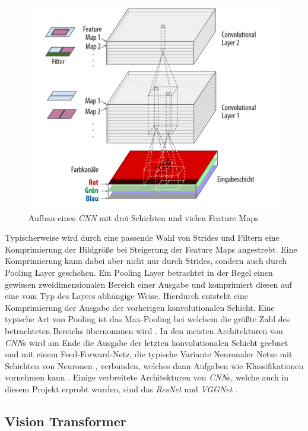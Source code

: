 \documentclass[twoside,a4paper]{IEEEtran}
\begin{document}
\begin{figure}[!htb]
	\includegraphics[width=\columnwidth]{cnn_example}
	\caption{Aufbau eines \emph{CNN} mit drei Schichten und vielen Feature Maps \cite[S.365]{MACHINE_LEARNING}}
	\label{bild2}
\end{figure}

Typischerweise wird durch eine passende Wahl von Strides und Filtern eine Komprimierung der Bildgröße bei Steigerung der Feature Maps angestrebt. Eine Komprimierung kann dabei aber nicht nur durch Strides, sondern auch durch Pooling Layer geschehen. Ein Pooling Layer betrachtet in der Regel einen gewissen zweidimensionalen Bereich einer Ausgabe und komprimiert diesen auf eine vom Typ des Layers abhängige Weise. Hierdurch entsteht eine Komprimierung der Ausgabe der vorherigen konvolutionalen Schicht. Eine typische Art von Pooling ist das Max-Pooling bei welchem die größte Zahl des betrachteten Bereichs übernommen wird \cite[S.369-370]{MACHINE_LEARNING}. In den meisten Architekturen von \emph{CNN}s wird am Ende die Ausgabe der letzten konvolutionalen Schicht geebnet und mit einem Feed-Forward-Netz, die typische Variante Neuronaler Netze mit Schichten von Neuronen \cite[S.263]{MACHINE_LEARNING}, verbunden, welches dann Aufgaben wie Klassifikationen vornehmen kann \cite[S.371]{MACHINE_LEARNING}. Einige verbreitete Architekturen von \emph{CNN}s, welche auch in diesem Projekt erprobt wurden, sind das \emph{ResNet} und \emph{VGGNet} \cite[S.378-381]{MACHINE_LEARNING}.

\subsection{Vision Transformer} %
\end{document}
